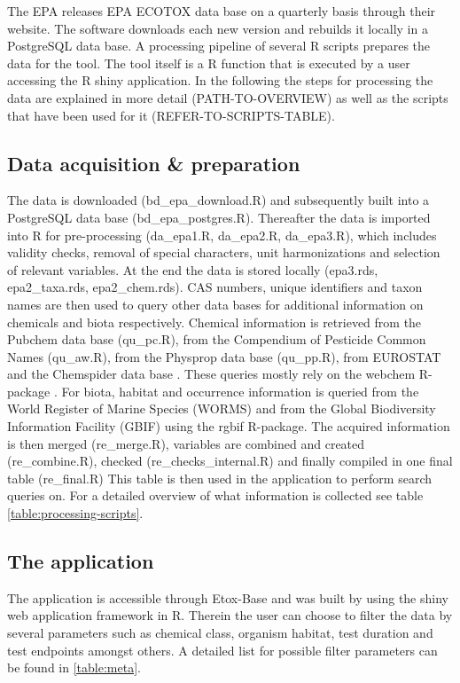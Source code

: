 \documentclass[english]{article}
\newcommand{\etoxbase}{Etox-Base}
\newcommand{\epa}{EPA ECOTOX data base}
\begin{document}
The EPA releases \epa{} on a quarterly basis through their website. The software downloads each new version and rebuilds it locally in a PostgreSQL data base. A processing pipeline of several R \citep{r_core_team_r_2017} scripts prepares the data for the tool. The tool itself is a R function that is executed by a user accessing the R shiny \citep{chang_shiny_2018} application. In the following the steps for processing the data are explained in more detail (PATH-TO-OVERVIEW) as well as the scripts that have been used for it (REFER-TO-SCRIPTS-TABLE).

\subsection*{Data acquisition \& preparation}

The data is downloaded (bd\_epa\_download.R) and subsequently built into a PostgreSQL data base (bd\_epa\_postgres.R). Thereafter the data is imported into R for pre-processing (da\_epa1.R, da\_epa2.R, da\_epa3.R), which includes validity checks, removal of special characters, unit harmonizations and selection of relevant variables. At the end the data is stored locally (epa3.rds, epa2\_taxa.rds, epa2\_chem.rds). CAS numbers, unique identifiers and taxon names are then used to query other data bases for additional information on chemicals and biota respectively. Chemical information is retrieved from the Pubchem data base \citep{CITE_PUBCHEM} (qu\_pc.R), from the Compendium of Pesticide Common Names \citep{CITE_AW} (qu\_aw.R), from the Physprop data base \citep{CITE_PHYSPROP} (qu\_pp.R), from EUROSTAT and the Chemspider data base \citep{CITE-CHEMSPIDER}. These queries mostly rely on the webchem R-package \citep{szocs_webchem_2015-1}. For biota, habitat and occurrence information is queried from the World Register of Marine Species (WORMS) \citep{WORMS} and from the Global Biodiversity Information Facility (GBIF) \citep{CITE_RGBIF} using the rgbif R-package. The acquired information is then merged (re\_merge.R), variables are combined and created (re\_combine.R), checked (re\_checks\_internal.R) and finally compiled in one final table (re\_final.R) This table is then used in the application to perform search queries on. For a detailed overview of what information is collected see table \ref{table:processing-scripts}.

\subsection*{The application}
The application is accessible through \etoxbase{} and was built by using the shiny web application framework \citep{chang_shiny_2018} in R. Therein the user can choose to filter the data by several parameters such as chemical class, organism habitat, test duration and test endpoints amongst others. A detailed list for possible filter parameters can be found in \ref{table:meta}. 
\end{document}
